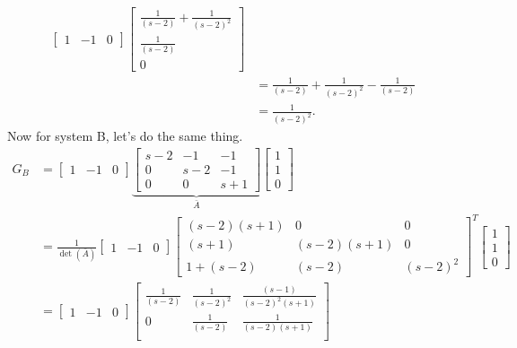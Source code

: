 \documentclass[10pt]{article}
\begin{document}
\begin{itemize}
\begin{equation}
\begin{split}
\begin{bmatrix}
      1 & -1 & 0
    \end{bmatrix}
    \begin{bmatrix}
      \frac{1}{(s-2)} +  \frac{1}{(s-2)^2}\\
       \frac{1}{(s-2)} \\
      0 
    \end{bmatrix}\\
    &=      \frac{1}{(s-2)} +  \frac{1}{(s-2)^2}-
       \frac{1}{(s-2)} \\
    &=  \frac{1}{(s-2)^2}.
  \end{split}
\end{equation}
Now for system B, let's do the same thing.
\begin{equation}
  \begin{split}
    G_B &=
    \begin{bmatrix}
      1 & -1 & 0
    \end{bmatrix}\underbrace{
    \begin{bmatrix}
      s-2 & -1 & -1 \\ 0 & s-2 & -1 \\ 0 & 0 & s+1
    \end{bmatrix}}_{\bar{A}}
    \begin{bmatrix}
      1 \\ 1\\ 0
    \end{bmatrix}\\
    &= \frac{1}{\det(\bar{A})}
    \begin{bmatrix}
      1 & -1 & 0
    \end{bmatrix}
    \begin{bmatrix}
      (s-2)(s+1) & 0 & 0 \\ (s+1) & (s-2)(s+1) & 0 \\ 1+ (s-2) &
      (s-2) & (s-2)^2
    \end{bmatrix}^T
    \begin{bmatrix}
      1 \\ 1 \\ 0
    \end{bmatrix}\\
    &= 
    \begin{bmatrix}
      1 & -1 & 0
    \end{bmatrix}
    \begin{bmatrix}
      \frac{1}{(s-2)} &  \frac{1}{(s-2)^2} &
      \frac{(s-1)}{(s-2)^2(s+1)} \\ 
      0 & \frac{1}{(s-2)} & \frac{1}{(s-2)(s+1)} \\

\end{bmatrix}
\end{split}
\end{equation}
\end{itemize}
\end{document}
